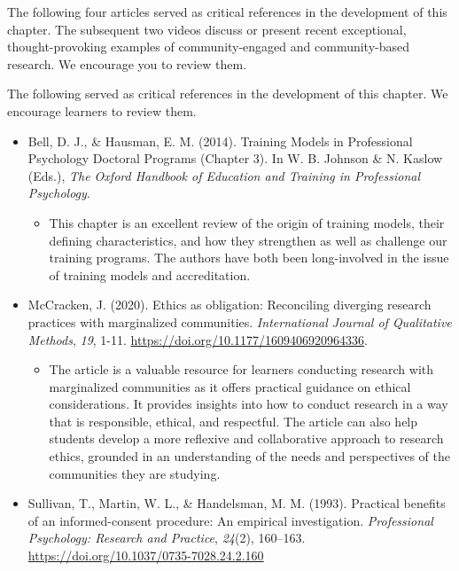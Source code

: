 \documentclass[
  11pt,
]{book}
\providecommand{\tightlist}{%
  \setlength{\itemsep}{0pt}\setlength{\parskip}{0pt}}
\begin{document}
The following four articles served as critical references in the development of this chapter. The subsequent two videos discuss or present recent exceptional, thought-provoking examples of community-engaged and community-based research. We encourage you to review them.

The following served as critical references in the development of this chapter. We encourage learners to review them.

\begin{itemize}
\tightlist
\item
  Bell, D. J., \& Hausman, E. M. (2014). Training Models in Professional Psychology Doctoral Programs (Chapter 3). In W. B. Johnson \& N. Kaslow (Eds.), \emph{The Oxford Handbook of Education and Training in Professional Psychology}.

  \begin{itemize}
  \tightlist
  \item
    This chapter is an excellent review of the origin of training models, their defining characteristics, and how they strengthen as well as challenge our training programs. The authors have both been long-involved in the issue of training models and accreditation.
  \end{itemize}
\item
  McCracken, J. (2020). Ethics as obligation: Reconciling diverging research practices with marginalized communities. \emph{International Journal of Qualitative Methods}, \emph{19}, 1-11. \url{https://doi.org/10.1177/1609406920964336}.

  \begin{itemize}
  \tightlist
  \item
    The article is a valuable resource for learners conducting research with marginalized communities as it offers practical guidance on ethical considerations. It provides insights into how to conduct research in a way that is responsible, ethical, and respectful. The article can also help students develop a more reflexive and collaborative approach to research ethics, grounded in an understanding of the needs and perspectives of the communities they are studying.
  \end{itemize}
\item
  Sullivan, T., Martin, W. L., \& Handelsman, M. M. (1993). Practical benefits of an informed-consent procedure: An empirical investigation. \emph{Professional Psychology: Research and Practice}, \emph{24}(2), 160--163. \url{https://doi.org/10.1037/0735-7028.24.2.160}


\end{itemize}
\end{document}

